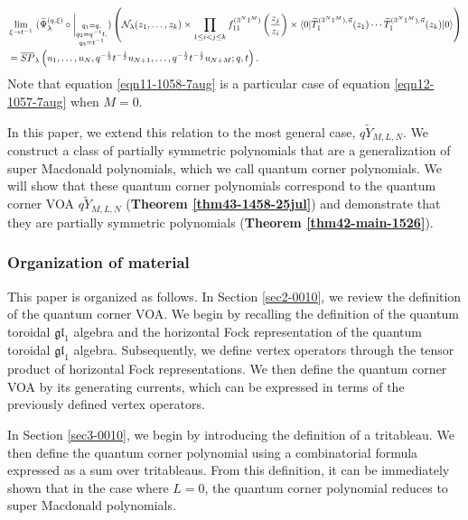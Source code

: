 \documentclass[12pt,reqno,a4paper]{amsart}
\newcommand{\comp}{\circ}
\newcommand{\cals}[1]{\mathcal{#1}}
\newcommand{\fraks}[1]{\mathfrak{#1}}
\numberwithin{equation}{section}
\newcommand{\dualmap}{
\widetilde{\Psi}^{(q,\xi)}_{\lambda}
}
\theoremstyle{definition}
\begin{document}
\footnotesize
\begin{align}
	&
	\lim_{\xi \rightarrow t^{-1}}\,\,
	(
	\dualmap
	\comp 
	\bigg|_{
		\substack{
			q_1 = q, \\
			q_2 = q^{-1}t,\\
			q_3 = t^{-1} \\
		}
	}
	)
	\left(
	\cals{N}_{\lambda}(z_1,\dots,z_k )
	\times
	\prod_{1 \leq i < j \leq k}f^{(3^N1^M)}_{11}\left(\frac{z_j}{z_i} \right)
	\times
	\langle 0 |\widetilde{T}^{(3^N1^M),\vec{u}}_{1}(z_1 )\cdots \widetilde{T}^{(3^N1^M),\vec{u}}_{1}(z_k )|0\rangle
	\right)
	\label{eqn12-1057-7aug}
	\\
	&= 
	\overline{SP}_\lambda\left(
	u_1,\dots,u_N, q^{-\frac{1}{2}}t^{-\frac{1}{2}}u_{N+1}, \dots, q^{-\frac{1}{2}}t^{-\frac{1}{2}}u_{N+M} ; q,t
	\right).
	\notag 
\end{align}
\normalsize
Note that equation \eqref{eqn11-1058-7aug} is a particular case of equation \eqref{eqn12-1057-7aug} when $M = 0$. 

In this paper, we extend this relation to the most general case, $q\widetilde{Y}_{M,L,N}$. We construct a class of partially symmetric polynomials that are a generalization of super Macdonald polynomials, which we call quantum corner polynomials. We will show that these quantum corner polynomials correspond to the quantum corner VOA $q\widetilde{Y}_{M,L,N}$ (\textbf{Theorem \ref{thm43-1458-25jul}}) and demonstrate that they are partially symmetric polynomials (\textbf{Theorem \ref{thm42-main-1526}}).


\subsubsection*{Organization of material}

This paper is organized as follows. In Section \ref{sec2-0010}, we review the definition of the quantum corner VOA. We begin by recalling the definition of the quantum toroidal $\fraks{gl}_1$ algebra and the horizontal Fock representation of the quantum toroidal $\fraks{gl}_1$ algebra. Subsequently, we define vertex operators through the tensor product of horizontal Fock representations. We then define the quantum corner VOA by its generating currents, which can be expressed in terms of the previously defined vertex operators.

In Section \ref{sec3-0010}, we begin by introducing the definition of a tritableau. We then define the quantum corner polynomial using a combinatorial formula expressed as a sum over tritableaus. From this definition, it can be immediately shown that in the case where $L = 0$, the quantum corner polynomial reduces to super Macdonald polynomials.
\end{document}
